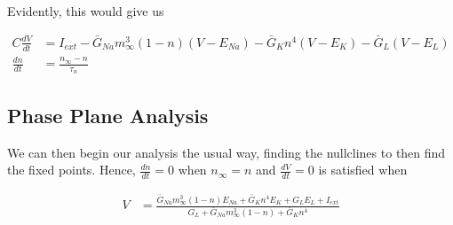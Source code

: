 \documentclass{article}
\begin{document}
Evidently, this would give us

\begin{align*}
        C\frac{dV}{dt} &= I_{ext}-\bar{G}_{Na}m_\infty^3(1-n)(V-E_{Na}) -\bar{G}_{K}n^4(V-E_{K})  -\bar{G}_{L}(V-E_{L}) \\
    \frac{dn}{dt} &= \frac{n_{\infty}-n}{\tau_n} 
\end{align*}

\subsection{Phase Plane Analysis}

We can then begin our analysis the usual way, finding the nullclines to then find the fixed points. Hence, $\frac{dn}{dt}=0$ when $n_{\infty}=n$ and $\frac{dV}{dt}=0$ is satisfied when

\begin{align*}
        V &= \frac{\bar{G}_{Na}m_\infty^3(1-n)E_{Na}+\bar{G}_Kn^4E_K + G_LE_L + I_{ext}}{G_L + \bar{G}_{Na}m_\infty^3(1-n)+ \bar{G}_Kn^4}
\end{align*}
\end{document}
